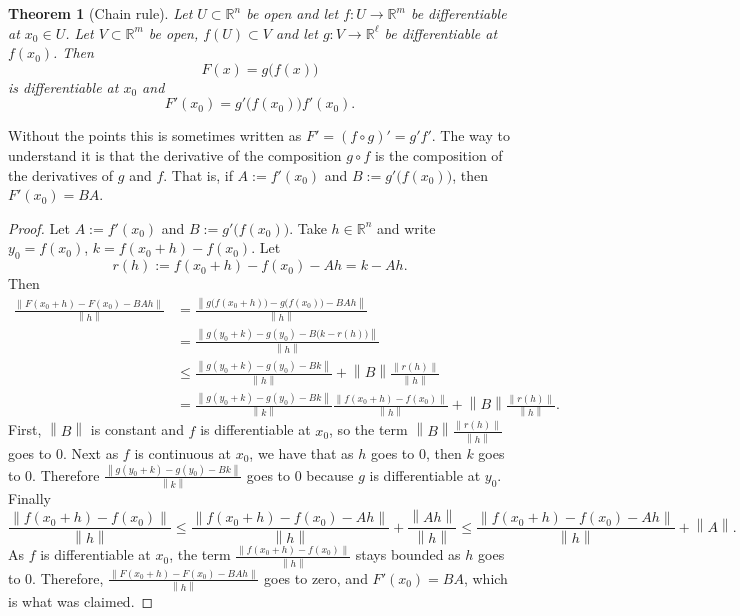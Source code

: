 \documentclass[12pt]{book}
\newcommand{\norm}[1]{\left\lVert {#1} \right\rVert}
\newcommand{\R}{{\mathbb{R}}}
\theoremstyle{plain}
\newtheorem{thm}{Theorem}[section]
\theoremstyle{remark}
\theoremstyle{definition}
\theoremstyle{exercise}
\theoremstyle{example}
\begin{document}
\begin{thm}[Chain rule]
Let $U \subset \R^n$ be open and let $f \colon U \to \R^m$ be
differentiable at $x_0 \in U$.  Let $V \subset \R^m$ be open,
$f(U) \subset V$ and let $g \colon V \to \R^\ell$ be differentiable
at $f(x_0)$.  Then
\begin{equation*}
F(x) = g\bigl(f(x)\bigr)
\end{equation*}
is differentiable at $x_0$ and
\begin{equation*}
F'(x_0) = g'\bigl(f(x_0)\bigr) f'(x_0) .
\end{equation*}
\end{thm}

Without the points this is sometimes written as $F' = {(f \circ g)}' = g' f'$.  The way to
understand it is that the derivative of the composition $g \circ f$
is the composition of the derivatives of $g$ and $f$.  That is, if $A :=
f'(x_0)$ and $B := g'\bigl(f(x_0)\bigr)$, then $F'(x_0) = BA$.

\begin{proof}
Let $A := f'(x_0)$ and $B := g'\bigl(f(x_0)\bigr)$.  Take $h \in \R^n$
and write $y_0 = f(x_0)$, $k = f(x_0+h)-f(x_0)$.  Let
\begin{equation*}
r(h) := f(x_0+h)-f(x_0) - A h = k - Ah.
\end{equation*}
Then
\begin{equation*}
\begin{split}
\frac{\norm{F(x_0+h)-F(x_0) - BAh}}{\norm{h}}
& =
\frac{\norm{g\bigl(f(x_0+h)\bigr)-g\bigl(f(x_0)\bigr) - BAh}}{\norm{h}}
\\
& =
\frac{\norm{g(y_0+k)-g(y_0) - B\bigl(k-r(h)\bigr)}}{\norm{h}}
\\
& \leq
\frac
{\norm{g(y_0+k)-g(y_0) - Bk}}
{\norm{h}}
+
\norm{B}
\frac
{\norm{r(h)}}
{\norm{h}}
\\
& =
\frac
{\norm{g(y_0+k)-g(y_0) - Bk}}
{\norm{k}}
\frac
{\norm{f(x_0+h)-f(x_0)}}
{\norm{h}}
+
\norm{B}
\frac
{\norm{r(h)}}
{\norm{h}} .
\end{split}
\end{equation*}
First, $\norm{B}$ is constant and $f$ is differentiable at $x_0$,
so
the term $\norm{B}\frac{\norm{r(h)}}{\norm{h}}$ goes to 0.
Next as $f$ is continuous at $x_0$, we have that as 
$h$ goes to 0, then $k$ goes to 0.  Therefore
$\frac
{\norm{g(y_0+k)-g(y_0) - Bk}}
{\norm{k}}$ goes to 0 because $g$ is differentiable at $y_0$.
Finally 
\begin{equation*}
\frac
{\norm{f(x_0+h)-f(x_0)}}
{\norm{h}}
\leq
\frac
{\norm{f(x_0+h)-f(x_0)-Ah}}
{\norm{h}}
+
\frac
{\norm{Ah}}
{\norm{h}}
\leq
\frac
{\norm{f(x_0+h)-f(x_0)-Ah}}
{\norm{h}}
+
\norm{A} .
\end{equation*}
As $f$ is differentiable at $x_0$,
the term
$
\frac
{\norm{f(x_0+h)-f(x_0)}}
{\norm{h}}
$
stays bounded as $h$ goes to 0.  Therefore, 
$\frac{\norm{F(x_0+h)-F(x_0) - BAh}}{\norm{h}}$ goes to zero, and
$F'(x_0) = BA$, which is what was claimed.
\end{proof}
\end{document}
